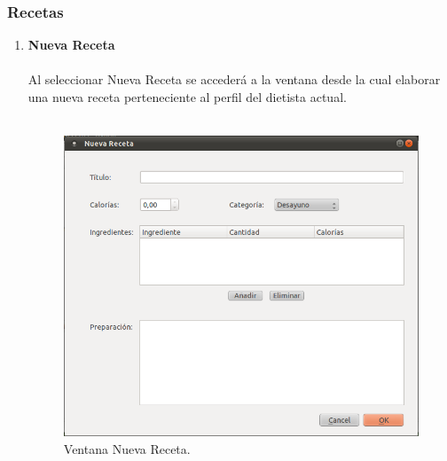 \subsubsection{Recetas}
\begin{enumerate}
\item \textbf{Nueva Receta}\\\\
Al seleccionar Nueva Receta se accederá a la ventana desde la cual elaborar una nueva receta perteneciente al perfil del dietista actual.\\\\
\begin{figure}[H]
  \label{nueva_receta}
  \begin{center}
    \includegraphics[scale=0.5]{../../Image/receta-nueva.png}
  \end{center}
  \caption{Ventana Nueva Receta.}
\end{figure}


\end{enumerate}
